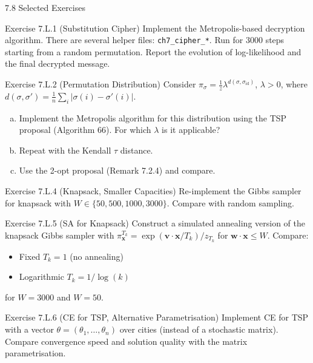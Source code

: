 \documentclass[aspectratio=169,10pt]{beamer}
\newcommand{\bx}{\mathbf{x}}
\newcommand{\bv}{\mathbf{v}}
\newcommand{\bw}{\mathbf{w}}
\begin{document}
\begin{frame}[allowframebreaks]{7.8 Selected Exercises}
  \begin{block}{Exercise 7.L.1 (Substitution Cipher)}
    Implement the Metropolis-based decryption algorithm.
    There are several helper files:
    \texttt{ch7\_cipher\_*}.
    Run for 3000 steps starting from a random permutation.
    Report the evolution of log-likelihood and the final decrypted message.
  \end{block}

  \begin{block}{Exercise 7.L.2 (Permutation Distribution)}
    Consider $\pi_\sigma = \frac{1}{z}\lambda^{d(\sigma,\sigma_{\mathrm{id}})}$,
    $\lambda > 0$, where $d(\sigma,\sigma') = \frac{1}{n}\sum_i |\sigma(i)-\sigma'(i)|$.
    \begin{enumerate}[(a)]
      \item Implement the Metropolis algorithm for this distribution using
        the TSP proposal (Algorithm 66). For which $\lambda$ is it applicable?
      \item Repeat with the Kendall $\tau$ distance.
      \item Use the 2-opt proposal (Remark 7.2.4) and compare.
    \end{enumerate}
  \end{block}

  \framebreak

  \begin{block}{Exercise 7.L.4 (Knapsack, Smaller Capacities)}
    Re-implement the Gibbs sampler for knapsack with $W \in \{50, 500, 1000, 3000\}$.
    Compare with random sampling.
  \end{block}

  \begin{block}{Exercise 7.L.5 (SA for Knapsack)}
    Construct a simulated annealing version of the knapsack Gibbs sampler
    with $\pi^{T_k}_{\bx} = \exp(\bv\cdot\bx/T_k)/z_{T_k}$ for $\bw\cdot\bx \le W$.
    Compare:
    \begin{itemize}
      \item Fixed $T_k=1$ (no annealing)
      \item Logarithmic $T_k = 1/\log(k)$
    \end{itemize}
    for $W=3000$ and $W=50$.
  \end{block}

  \begin{block}{Exercise 7.L.6 (CE for TSP, Alternative Parametrisation)}
    Implement CE for TSP with a vector $\theta = (\theta_1,\ldots,\theta_n)$
    over cities (instead of a stochastic matrix).
    Compare convergence speed and solution quality with the matrix
    parametrisation.
  \end{block}
\end{frame}
\end{document}
